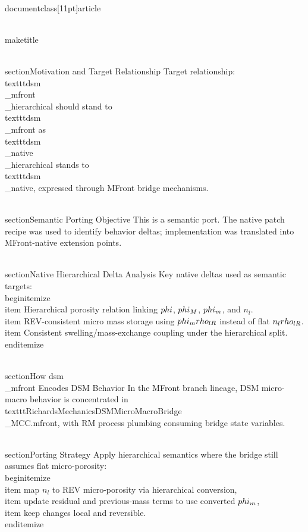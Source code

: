 \\documentclass[11pt]{article}
\begin{document}
\\maketitle

\\section{Motivation and Target Relationship}
Target relationship: \\texttt{dsm\\_mfront\\_hierarchical} should stand to \\texttt{dsm\\_mfront} as \\texttt{dsm\\_native\\_hierarchical} stands to \\texttt{dsm\\_native}, expressed through MFront bridge mechanisms.

\\section{Semantic Porting Objective}
This is a semantic port. The native patch recipe was used to identify behavior deltas; implementation was translated into MFront-native extension points.

\\section{Native Hierarchical Delta Analysis}
Key native deltas used as semantic targets:
\\begin{itemize}
\\item Hierarchical porosity relation linking $\\phi$, $\\phi_M$, $\\phi_m$, and $n_l$.
\\item REV-consistent micro mass storage using $\\phi_m \\rho_{lR}$ instead of flat $n_l \\rho_{lR}$.
\\item Consistent swelling/mass-exchange coupling under the hierarchical split.
\\end{itemize}

\\section{How dsm\\_mfront Encodes DSM Behavior}
In the MFront branch lineage, DSM micro-macro behavior is concentrated in \\texttt{RichardsMechanicsDSMMicroMacroBridge\\_MCC.mfront}, with RM process plumbing consuming bridge state variables.

\\section{Porting Strategy}
Apply hierarchical semantics where the bridge still assumes flat micro-porosity:
\\begin{itemize}
\\item map $n_l$ to REV micro-porosity via hierarchical conversion,
\\item update residual and previous-mass terms to use converted $\\phi_m$,
\\item keep changes local and reversible.
\\end{itemize}
\end{document}

